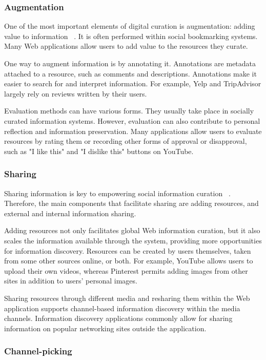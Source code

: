{{{\subsubsection{Augmentation}
One of the most important elements of digital curation is augmentation: adding value to information ~\cite{beagrie2008digital,whittaker2011personal}. It is often performed within social bookmarking systems. Many Web applications allow users to add value to the resources they curate. 

One way to augment information is by annotating it. Annotations are metadata attached to a resource, such as comments and descriptions. Annotations make it easier to search for and interpret information. For example, Yelp and TripAdvisor largely rely on reviews written by their users. 

Evaluation methods can have various forms. They usually take place in socially curated information systems. However, evaluation can also contribute to personal reflection and information preservation. Many applications allow users to evaluate resources by rating them or recording other forms of approval or disapproval, such as "I like this" and "I dislike this" buttons on YouTube.
} %

{\subsubsection{Sharing}
Sharing information is key to empowering social information curation ~\cite{beagrie2008digital}. Therefore, the main components that facilitate sharing are adding resources, and external and internal information sharing.

Adding resources not only facilitates global Web information curation, but it also scales the information available through the system, providing more opportunities for information discovery. Resources can be created by users themselves, taken from some other sources online, or both. For example, YouTube allows users to upload their own videos, whereas Pinterest permits adding images from other sites in addition to users' personal images. 

Sharing resources through different media and resharing them within the Web application supports channel-based information discovery within the media channels. Information discovery applications commonly allow for sharing information on popular networking sites outside the application.
} %

{\subsubsection{Channel-picking}

}}}
